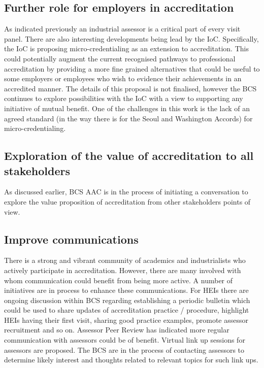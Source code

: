 \documentclass[sigconf]{acmart}
\begin{document}
\subsection {Further role for employers in accreditation}
As indicated previously an industrial assessor is a critical part of every visit panel. There are also interesting developments being lead by the IoC. Specifically, the IoC is proposing micro-credentialing as an extension to accreditation. This could potentially augment the current recognised pathways to professional accreditation by providing a more fine grained alternatives that could be useful to some employers or employees who wish to evidence their achievements in an accredited manner. The details of this proposal is not finalised, however the BCS continues to explore possibilities with the IoC with a view to supporting any initiative of mutual benefit. One of the challenges in this work is the lack of an agreed standard (in the way there is for the Seoul and Washington Accords) for micro-credentialing.

\subsection {Exploration of the value of accreditation to all stakeholders}
As discussed earlier,  BCS AAC is in the process of initiating a conversation to explore the value proposition of accreditation from other stakeholders points of view.

\subsection {Improve communications}
There is a strong and vibrant community of academics and industrialists who actively participate in accreditation. However, there are many involved with whom communication could benefit from being more active. A number of initiatives are in process to enhance these communications. For HEIs there are ongoing discussion within BCS regarding establishing a periodic bulletin which could be used to share updates of accreditation practice / procedure, highlight HEIs having their first visit, sharing good practice examples, promote assessor recruitment and so on. Assessor Peer Review has indicated more regular communication with assessors could be of benefit. Virtual link up sessions for assessors are proposed. The BCS are in the process of contacting assessors to determine likely interest and thoughts related to relevant topics for such link ups.
\end{document}
